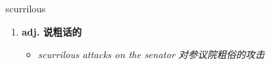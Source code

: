 
\begin{frame}
{\huge scurrilous}
\begin{center}
\begin{enumerate}\Large
  \item \textbf{adj. 说粗话的}
  \begin{itemize}
    \item \em{\Large{scurrilous attacks on the senator 对参议院粗俗的攻击}}
  \end{itemize}
\end{enumerate}
\end{center}
\end{frame}
